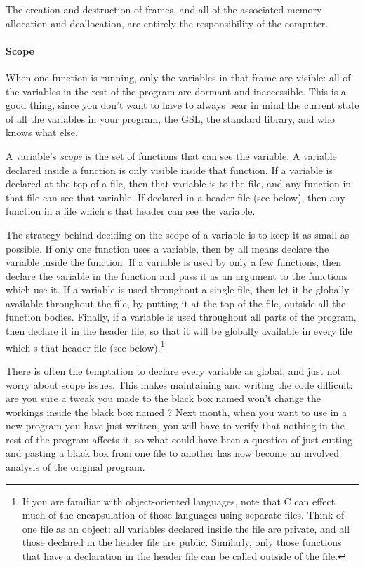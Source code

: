 \documentclass[12pt]{article}
\begin{document}
The creation and destruction of frames, and all of the associated
memory allocation and deallocation, are entirely the responsibility of
the computer.   

\paragraph{Scope}	\label{scope}

When one function is running, only the variables in that frame are
visible: all of the variables in the rest of the program are 
dormant and inaccessible.  This is a good thing, since you 
don't want to have to always bear in mind the current state of all the
variables in your program, the GSL, the standard library, and who knows
what else.

A variable's {\sl scope} is the set of functions that can see the
variable. A variable declared inside a function is only visible inside
that function.  If a variable is declared at the top of a file, then
that variable is  to the file, and any function in that
file can see that variable. If declared in a header file (see below),
then any function in a file which s that header  can see
the variable.

The strategy behind deciding on the scope of a variable is
to keep it as small as possible. If only one function uses a variable,
then by all means declare the variable inside the function.
If a variable is used by only a few functions,
then declare the variable in the  function and pass it as an
argument to the functions which use it. If a variable is used throughout
a single file, then let it be globally available throughout the file, by
putting it at the top of the file, outside all the function bodies. Finally,
if a variable is used throughout all parts of the program, then declare it in
the header file, so that it will be globally available in every
file which s that header file (see below).\footnote{If
you are familiar with object-oriented languages, note that C can effect
much of the encapsulation of those languages using separate files. Think
of one file as an object: all variables declared inside the file are
private, and all those declared in the header file are public. Similarly,
only those functions that have a declaration in the header file can be
called outside of the file.}

There is often the temptation to declare every variable as global, and
just not worry about scope issues. This makes maintaining and writing
the code difficult: are you sure a tweak you made to the black box named
 won't change the workings inside the black box named
? Next month, when you want to use 
in a new program you have just written, you will have to verify that nothing
in the rest of the program affects it, so what could have been a question
of just cutting and pasting a black box from one file to another has
now become an involved analysis of the original program.  
\end{document}
